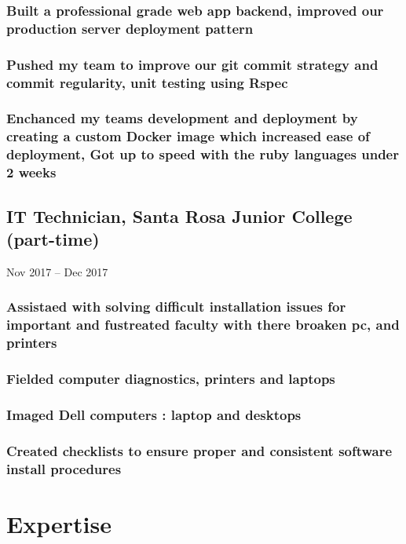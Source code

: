 \documentclass{article}
\begin{document}
	        \subsubsection{Built a professional grade web app backend, improved our production server deployment pattern}
            \subsubsection{Pushed my team to improve our git commit strategy and commit regularity, unit testing using Rspec}
            \subsubsection{Enchanced my teams development and deployment by creating a custom Docker image which increased ease of deployment, Got up to speed with the ruby languages under 2 weeks}
            
    \subsection{IT Technician, Santa Rosa Junior College (part-time)}Nov 2017 – Dec 2017
        
        \vspace{-2mm}
    	\subsubsection{Assistaed with solving difficult installation issues for important and fustreated faculty with there broaken pc, and printers  }
    	\subsubsection{Fielded computer diagnostics, printers and laptops }
    	\subsubsection{Imaged Dell computers : laptop and desktops }
    	\subsubsection{Created checklists to ensure proper and consistent software install procedures}

\section{Expertise}
\end{document}
